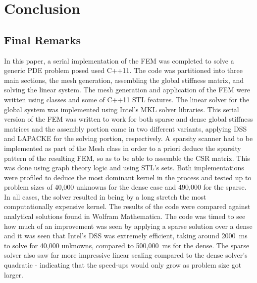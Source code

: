 \clearpage
\chapter{Conclusion}

\section{Final Remarks}

In this paper, a serial implementation of the FEM was completed to solve a generic PDE problem posed used C++11. The code was partitioned into three main sections, the mesh generation, assembling the global stiffness matrix, and solving the  linear system. The mesh generation and application of the FEM were written using classes and some of C++11 STL features. The linear solver for the global system was implemented using Intel's MKL solver libraries. This serial version of the FEM was written to work for both sparse and dense global stiffness matrices and the assembly portion came in two different variants, applying DSS and LAPACKE for the solving portion, respectively. A sparsity scanner had to be implemented as part of the Mesh class in order to a priori deduce the sparsity pattern of the resulting FEM, so as to be able to assemble the CSR matrix. This was done using graph theory logic and using STL's sets. Both implementations were profiled to deduce the most dominant kernel in the process and tested up to problem sizes of 40,000 unknowns for the dense case and 490,000 for the sparse. In all cases, the solver resulted in being by a long stretch the most computationally expensive kernel. The results of the code were compared against analytical solutions found in Wolfram Mathematica. The code was timed to see how much of an improvement was seen by applying a sparse solution over a dense and it was seen that Intel's DSS was extremely efficient, taking around 2000~ms to solve for 40,000 unknowns, compared to 500,000~ms for the dense. The sparse solver also saw far more impressive linear scaling compared to the dense solver's quadratic - indicating that the speed-ups would only grow as problem size got larger.

